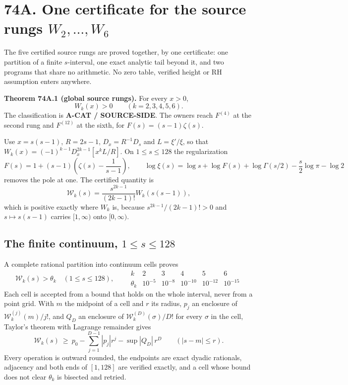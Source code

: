 \documentclass[
  11pt,
]{book}
\renewenvironment{quote}
  {\begin{tcolorbox}[
      enhanced,
      breakable,
      colback=tncream,
      colframe=tnrust,
      boxrule=0.8pt,
      arc=1.5pt,
      left=7pt,
      right=7pt,
      top=6pt,
      bottom=6pt]}
  {\end{tcolorbox}}
\begin{document}
\section{\texorpdfstring{74A. One certificate for the source rungs
\(W_2,\ldots,W_6\)}{74A. One certificate for the source rungs W\_2,\textbackslash ldots,W\_6}}\label{a.-one-certificate-for-the-source-rungs-w_2ldotsw_6}

The five certified source rungs are proved together, by one certificate:
one partition of a finite \(s\)-interval, one exact analytic tail beyond
it, and two programs that share no arithmetic. No zero table, verified
height or RH assumption enters anywhere.

\begin{quote}
\textbf{Theorem 74A.1 (global source rungs).} For every \(x>0\), \[
\boxed{W_k(x)>0\qquad(k=2,3,4,5,6).}
\tag{74A.1}
\] The classification is \textbf{A-CAT / SOURCE-SIDE}. The owners reach
\(F^{(4)}\) at the second rung and \(F^{(12)}\) at the sixth, for
\(F(s)=(s-1)\zeta(s)\).
\end{quote}

Use \(x=s(s-1)\), \(R=2s-1\), \(D_x=R^{-1}D_s\) and \(L=\xi'/\xi\), so
that \(W_k(x)=(-1)^{k-1}D_x^{2k-1}[x^kL/R]\). On \(1\le s\le128\) the
regularization \[
F(s)=1+(s-1)\left(\zeta(s)-\frac1{s-1}\right),\qquad
\log\xi(s)=\log s+\log F(s)+\log\Gamma(s/2)
-\frac s2\log\pi-\log2
\tag{74A.2}
\] removes the pole at one. The certified quantity is \[
\mathcal W_k(s)=\frac{s^{2k-1}}{(2k-1)!}W_k(s(s-1)),
\tag{74A.3}
\] which is positive exactly where \(W_k\) is, because
\(s^{2k-1}/(2k-1)!>0\) and \(s\mapsto s(s-1)\) carries \([1,\infty)\)
onto \([0,\infty)\).

\subsection{\texorpdfstring{The finite continuum,
\(1\le s\le128\)}{The finite continuum, 1\textbackslash le s\textbackslash le128}}\label{the-finite-continuum-1le-sle128}

A complete rational partition into continuum cells proves \[
\boxed{\mathcal W_k(s)>\theta_k\quad(1\le s\le128)},\qquad
\begin{array}{c|ccccc}
k&2&3&4&5&6\\\hline
\theta_k&10^{-5}&10^{-8}&10^{-10}&10^{-12}&10^{-15}
\end{array}
\tag{74A.4}
\] Each cell is accepted from a bound that holds on the whole interval,
never from a point grid. With \(m\) the midpoint of a cell and \(r\) its
radius, \(p_j\) an enclosure of \(\mathcal W_k^{(j)}(m)/j!\), and
\(Q_D\) an enclosure of \(\mathcal W_k^{(D)}(\sigma)/D!\) for every
\(\sigma\) in the cell, Taylor's theorem with Lagrange remainder gives
\[
\mathcal W_k(s)\ \ge\
p_0-\sum_{j=1}^{D-1}|p_j|r^j-\sup|Q_D|\,r^D
\qquad(|s-m|\le r).
\tag{74A.5}
\] Every operation is outward rounded, the endpoints are exact dyadic
rationals, adjacency and both ends of \([1,128]\) are verified exactly,
and a cell whose bound does not clear \(\theta_k\) is bisected and
retried.
\end{document}
